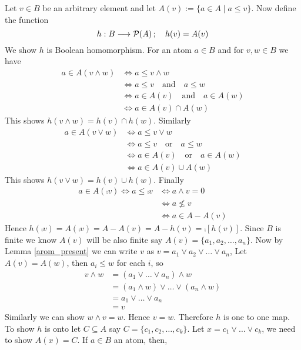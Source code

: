 \begin{myproof}
    Let \(v\in B\) be an arbitrary element and let \(A(v):=\{a\in A\mid a\leq v\}\). Now define the function
    \[
    h:B\longrightarrow \mathcal{P}(A)\,;\quad h(v)=A(v)
    \]
    We show \(h\) is Boolean homomorphism. For an atom \(a\in B\) and for \(v,w\in B\) we have
    \begin{align*}
        a\in A(v\wedge w)&\Longleftrightarrow a\leq v\wedge w\\
        &\Longleftrightarrow a\leq v\quad\text{and}\quad a\leq w\\
        &\Longleftrightarrow a\in A(v)\quad\text{and}\quad a\in A(w)\\
        &\Longleftrightarrow a\in A(v)\cap A(w)
    \end{align*}
    This shows \(h(v\wedge w)=h(v)\cap h(w)\). Similarly
    \begin{align*}
        a\in A(v\vee w)&\Longleftrightarrow a\leq v\vee w\\
        &\Longleftrightarrow a\leq v\quad\text{or}\quad a\leq w\\
        &\Longleftrightarrow a\in A(v)\quad\text{or}\quad a\in A(w)\\
        &\Longleftrightarrow a\in A(v)\cup A(w)
    \end{align*}
    This shows \(h(v\vee w)=h(v)\cup h(w)\). Finally
    \begin{align*}
        a\in A(\comp{v})\Longleftrightarrow a\leq\comp{v}&\Longleftrightarrow a\wedge v=0\\
        &\Longleftrightarrow a\nleq v\\
        &\Longleftrightarrow a\in A-A(v)
    \end{align*}
    Hence \(h(\comp{v})=A(\comp{v})=A-A(v)=A-h(v)=\comp{[h(v)]}\). Since \(B\) is finite we know \(A(v)\) will be also finite say \(A(v)=\{a_1,a_2,\dots,a_n\}\). Now by Lemma \ref{arom_present} we can write \(v\) as \(v=a_1\vee a_2\vee\dots\vee a_n\), Let \(A(v)=A(w)\), then \(a_i\leq w\) for each \(i\), so
    \begin{align*}
        v\wedge w&=(a_1\vee\dots\vee a_n)\wedge w\\
        &=(a_1\wedge w)\vee\dots\vee(a_n\wedge w)\\
        &=a_1\vee\dots\vee a_n\\
        &=v
    \end{align*}
    Similarly we can show \(w\wedge v=w\). Hence \(v=w\). Therefore \(h\) is one to one map. To show \(h\) is onto let \(C\subseteq A\) say \(C=\{c_1,c_2,\dots,c_k\}\). Let \(x=c_1\vee\dots\vee c_k\), we need to show \(A(x)=C\). If \(a\in B\) an atom, then,

\end{myproof}
